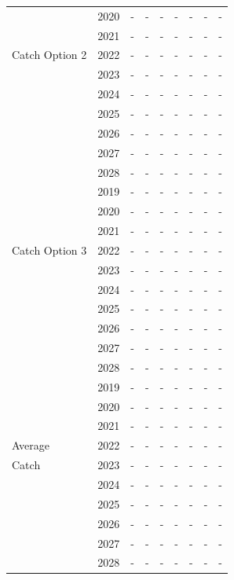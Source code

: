 \documentclass[12pt,]{article}
\begin{document}
\begin{table}[ht]
{\begin{tabular}{l|cc|>{\centering}p{.7in}c|>{\centering}p{.7in}c|>{\centering}p{.7in}c}
   & 2020 & - & - & - & - & - & - & - \\ 
   & 2021 & - & - & - & - & - & - & - \\ 
  Catch Option 2 & 2022 & - & - & - & - & - & - & - \\ 
   & 2023 & - & - & - & - & - & - & - \\ 
   & 2024 & - & - & - & - & - & - & - \\ 
   & 2025 & - & - & - & - & - & - & - \\ 
   & 2026 & - & - & - & - & - & - & - \\ 
   & 2027 & - & - & - & - & - & - & - \\ 
   & 2028 & - & - & - & - & - & - & - \\ 
   \hline
 & 2019 & - & - & - & - & - & - & - \\ 
   & 2020 & - & - & - & - & - & - & - \\ 
   & 2021 & - & - & - & - & - & - & - \\ 
  Catch Option 3 & 2022 & - & - & - & - & - & - & - \\ 
   & 2023 & - & - & - & - & - & - & - \\ 
   & 2024 & - & - & - & - & - & - & - \\ 
   & 2025 & - & - & - & - & - & - & - \\ 
   & 2026 & - & - & - & - & - & - & - \\ 
   & 2027 & - & - & - & - & - & - & - \\ 
   & 2028 & - & - & - & - & - & - & - \\ 
   \hline
 & 2019 & - & - & - & - & - & - & - \\ 
   & 2020 & - & - & - & - & - & - & - \\ 
   & 2021 & - & - & - & - & - & - & - \\ 
  Average & 2022 & - & - & - & - & - & - & - \\ 
  Catch & 2023 & - & - & - & - & - & - & - \\ 
   & 2024 & - & - & - & - & - & - & - \\ 
   & 2025 & - & - & - & - & - & - & - \\ 
   & 2026 & - & - & - & - & - & - & - \\ 
   & 2027 & - & - & - & - & - & - & - \\ 
   & 2028 & - & - & - & - & - & - & - \\ 
   \hline
\end{tabular}
}
\end{table}

\clearpage
\end{document}

